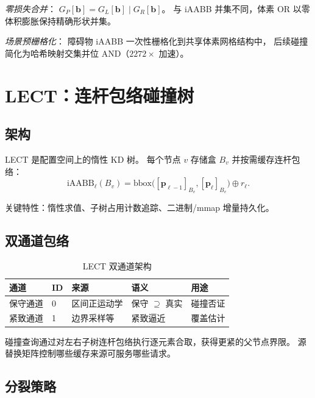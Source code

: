 \documentclass[journal]{IEEEtran}
\newcommand{\iAABB}{\mathrm{iAABB}}
\begin{document}
\emph{零损失合并}：
$G_P[\bm{b}] = G_L[\bm{b}] \mathbin{|} G_R[\bm{b}]$。
与 iAABB 并集不同，体素 OR 以零体积膨胀保持精确形状并集。

\emph{场景预栅格化}：
障碍物 iAABB 一次性栅格化到共享体素网格结构中，
后续碰撞简化为哈希映射交集并位 AND（$2272{\times}$ 加速）。

\section{LECT：连杆包络碰撞树}\label{sec:lect}

\subsection{架构}

LECT 是配置空间上的惰性 KD 树。
每个节点 $v$ 存储盒 $B_v$ 并按需缓存连杆包络：
\begin{equation}
  \iAABB_\ell(B_v) = \mathrm{bbox}\bigl([\bm{p}_{\ell-1}]_{B_v},
  [\bm{p}_\ell]_{B_v}\bigr) \oplus r_\ell.
\end{equation}

关键特性：惰性求值、子树占用计数追踪、二进制/mmap 增量持久化。

\subsection{双通道包络}

\begin{table}[ht]
\centering
\caption{LECT 双通道架构}
\label{tab:channels}
\begin{tabular}{@{}lllll@{}}
\toprule
\textbf{通道} & \textbf{ID} & \textbf{来源} & \textbf{语义} & \textbf{用途} \\
\midrule
保守通道 & 0 & 区间正运动学 & 保守 $\supseteq$ 真实 & 碰撞否证 \\
紧致通道 & 1 & 边界采样等 & 紧致逼近 & 覆盖估计 \\
\bottomrule
\end{tabular}
\end{table}

碰撞查询通过对左右子树连杆包络执行逐元素合取，获得更紧的父节点界限。
源替换矩阵控制哪些缓存来源可服务哪些请求。

\subsection{分裂策略}
\end{document}
